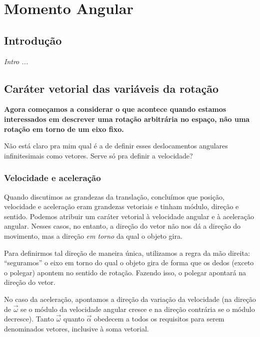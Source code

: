 \chapter{Momento Angular}
\label{Chap:MomentoAngular}

\section{Introdução}

{\it
Intro ...
}



\section{Caráter vetorial das variáveis da rotação}

\textbf{Agora começamos a considerar o que acontece quando estamos interessados em descrever uma rotação arbitrária no espaço, não uma rotação em torno de um eixo fixo.}

Não está claro pra mim qual é a de definir esses deslocamentos angulares infinitesimais como vetores. Serve só pra definir a velocidade?

\subsection{Velocidade e aceleração}

Quando discutimos as grandezas da translação, concluímos que posição, velocidade e aceleração eram grandezas vetoriais e tinham módulo, direção e sentido. Podemos atribuir um caráter vetorial à velocidade angular e à aceleração angular. Nesses casos, no entanto, a direção do vetor não nos dá a direção do movimento, mas a direção \emph{em torno} da qual o objeto gira.

Para definirmos tal direção de maneira única, utilizamos a regra da mão direita: ``seguramos'' o eixo em torno do qual o objeto gira de forma que os dedos (exceto o polegar) apontem no sentido de rotação. Fazendo isso, o polegar apontará na direção do vetor.

No caso da aceleração, apontamos a direção da variação da velocidade (na direção de $\vec{\omega}$ se o módulo da velocidade angular cresce e na direção contrária se o módulo decresce). Tanto $\vec{\omega}$ quanto $\vec{\alpha}$ obedecem a todos os requisitos para serem denominados vetores, inclusive à soma vetorial.

